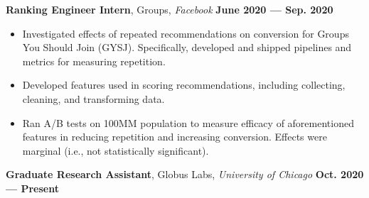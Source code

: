 \documentclass[11pt,letterpaper,roman,colorlinks,linkcolor=blue]{moderncv}
\begin{document}
\textbf{Ranking Engineer Intern}, Groups, \emph{Facebook}
\hfill \textbf{June 2020 --- Sep. 2020}
\begin{itemize}
\item Investigated effects of repeated recommendations on conversion for Groups You Should Join (GYSJ). Specifically, developed and shipped pipelines and metrics for measuring repetition. 
\item Developed features used in scoring recommendations, including collecting, cleaning, and transforming data.
\item Ran A/B tests on 100MM population to measure efficacy of aforementioned features in reducing repetition and increasing conversion. Effects were marginal (i.e., not statistically significant).
\end{itemize}

\textbf{Graduate Research Assistant}, Globus Labs, \emph{University of Chicago}
\hfill \textbf{Oct. 2020 --- Present}
\end{document}
